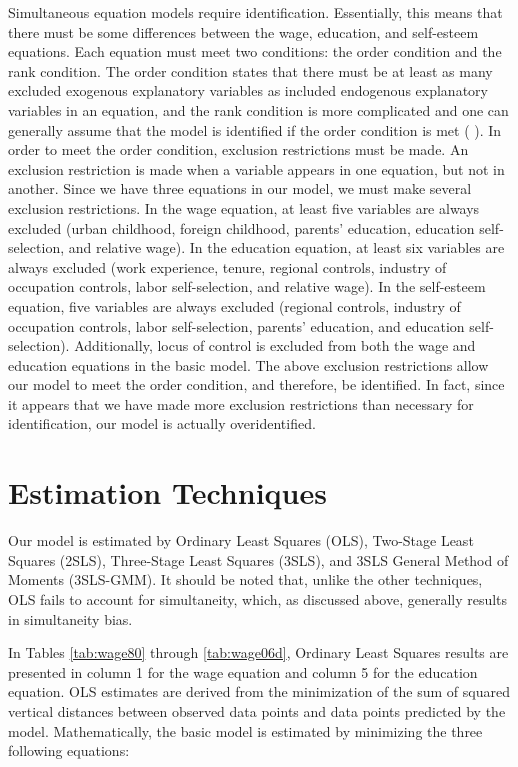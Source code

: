 \documentclass[12pt]{report}
\newcommand{\citee}[1]{\citename{#1} \citeyear{#1}}
\begin{document}
Simultaneous equation models require identification. Essentially, this means that there must be some differences between the wage, education, and self-esteem equations. Each equation must meet two conditions: the order condition and the rank condition. The order condition states that there must be at least as many excluded exogenous explanatory variables as included endogenous explanatory variables in an equation, and the rank condition is more complicated and one can generally assume that the model is identified if the order condition is met (\citee{W2009}). In order to meet the order condition, exclusion restrictions must be made. An exclusion restriction is made when a variable appears in one equation, but not in another. Since we have three equations in our model, we must make several exclusion restrictions. In the wage equation, at least five variables are always excluded (urban childhood, foreign childhood, parents' education, education self-selection, and relative wage). In the education equation, at least six variables are always excluded (work experience, tenure, regional controls, industry of occupation controls, labor self-selection, and relative wage). In the self-esteem equation, five variables are always excluded (regional controls, industry of occupation controls, labor self-selection, parents' education, and education self-selection). Additionally, locus of control is excluded from both the wage and education equations in the basic model. The above exclusion restrictions allow our model to meet the order condition, and therefore, be identified. In fact, since it appears that we have made more exclusion restrictions than necessary for identification, our model is actually overidentified.

\section*{Estimation Techniques}

Our model is estimated by Ordinary Least Squares (OLS), Two-Stage Least Squares (2SLS), Three-Stage Least Squares (3SLS), and 3SLS General Method of Moments (3SLS-GMM). It should be noted that, unlike the other techniques, OLS fails to account for simultaneity, which, as discussed above, generally results in simultaneity bias.

In Tables \ref{tab:wage80} through \ref{tab:wage06d}, Ordinary Least Squares results are presented in column 1 for the wage equation and column 5 for the education equation. OLS estimates are derived from the minimization of the sum of squared vertical distances between observed data points and data points predicted by the model. Mathematically, the basic model is estimated by minimizing the three following equations:
\end{document}

